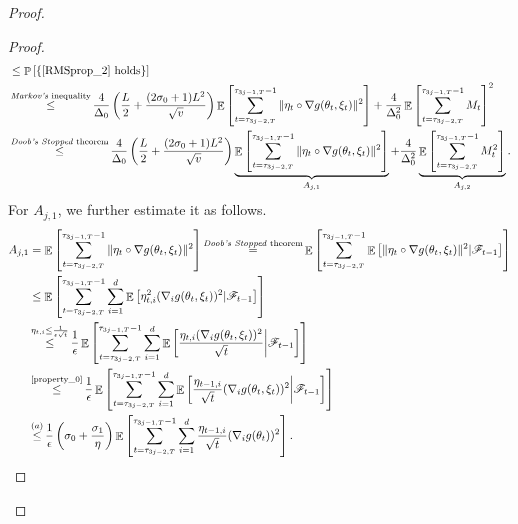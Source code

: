 \documentclass[standalone]{article}
\DeclareMathOperator{\Expect}{\mathbb{E}}
\DeclareMathOperator{\Pro}{\mathbb{P}}
\begin{document}
\begin{proof}
\begin{proof}
\begin{align}
& \le\Pro\left[\{\text{\cref{RMSprop_2} holds}\}\right]\notag\\&\mathop{\le}^{\text{\emph{Markov's} inequality}}\frac{4}{\Delta_{0}}\left(\frac{ L}{2}+\frac{(2\sigma_{0}+1) L^{2}}{\sqrt{v}}\right)\Expect\left[\sum_{t=\tau_{3j-2,T}}^{\tau_{3j-1,T}-1}\|\eta_t\circ \nabla g(\theta_{t},\xi_{t})\|^{2}\right]+\frac{4}{\Delta_{0}^{2}}\Expect\left[\sum_{t=\tau_{3j-2,T}}^{\tau_{3j-1,T}-1}M_{t}\right]^{2}\notag\\&\mathop{\le}^{\text{\emph{Doob's Stopped} theorem}}\frac{4}{\Delta_{0}}\left(\frac{ L}{2}+\frac{(2\sigma_{0}+1) L^{2}}{\sqrt{v}}\right)\underbrace{\Expect\left[\sum_{t=\tau_{3j-2,T}}^{\tau_{3j-1,T}-1}\|\eta_t\circ \nabla g(\theta_{t},\xi_{t})\|^{2}\right]}_{A_{j,1}}+\frac{4}{\Delta_{0}^{2}}\underbrace{\Expect\left[\sum_{t=\tau_{3j-2,T}}^{\tau_{3j-1,T}-1}M^{2}_{t}\right]}_{A_{j,2}}.
\end{align}
For \(A_{j,1}\), we further estimate it as follows.
\begin{align*}
A_{j,1}&=\Expect\left[\sum_{t=\tau_{3j-2,T}}^{\tau_{3j-1,T}-1}\|\eta_t\circ \nabla g(\theta_{t},\xi_{t})\|^{2}\right]\mathop{=}^{\text{\emph{Doob's Stopped} theorem}}\Expect\left[\sum_{t=\tau_{3j-2,T}}^{\tau_{3j-1,T}-1}\Expect\left[\|\eta_t\circ \nabla g(\theta_{t},\xi_{t})\|^{2}|\mathscr{F}_{t-1}\right]\right]\\&\le\Expect\left[\sum_{t=\tau_{3j-2,T}}^{\tau_{3j-1,T}-1}\sum_{i=1}^{d}\Expect\left[\eta^{2}_{{t},i}(\nabla_{i}g(\theta_{t},\xi_{t}))^{2}|\mathscr{F}_{t-1}\right]\right] \notag \\
& \mathop{\le}^{\eta_{t,i}\le \frac{1}{\epsilon\sqrt{t}}}\frac{1}{\epsilon}\Expect\left[\sum_{t=\tau_{3j-2,T}}^{\tau_{3j-1,T}-1}\sum_{i=1}^{d}\Expect\left[\frac{\eta_{t,i}(\nabla_{i}g(\theta_{t},\xi_{t}))^{2}}{\sqrt{t}}\bigg|\mathscr{F}_{t-1}\right]\right]\\&\mathop{\le}^{\text{\cref{property_0}}}\frac{1}{\epsilon}\Expect\left[\sum_{t=\tau_{3j-2,T}}^{\tau_{3j-1,T}-1}\sum_{i=1}^{d}\Expect\left[\frac{\eta_{{t-1},i}}{\sqrt{t}}(\nabla_{i}g(\theta_{t},\xi_{t}))^{2}\bigg|\mathscr{F}_{t-1}\right]\right] \notag \\
&\mathop{\le}^{(a)}\frac{1}{\epsilon}\left(\sigma_{0}+\frac{\sigma_{1}}{\eta}\right)\Expect\left[\sum_{t=\tau_{3j-2,T}}^{\tau_{3j-1,T}-1}\sum_{i=1}^{d}\frac{\eta_{{t-1},i}}{\sqrt{t}}(\nabla_{i}g(\theta_{t}))^{2}\right].

\end{align*}
\end{proof}
\end{proof}
\end{document}
